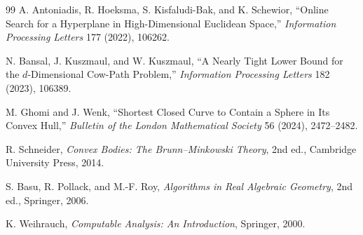 \documentclass[10pt,a4paper]{article}
\theoremstyle{definition}
\theoremstyle{remark}
\begin{document}
\begin{thebibliography}{99}
A. Antoniadis, R. Hoeksma, S. Kisfaludi-Bak, and K. Schewior,
``Online Search for a Hyperplane in High-Dimensional Euclidean Space,''
\emph{Information Processing Letters} 177 (2022), 106262.

N. Bansal, J. Kuszmaul, and W. Kuszmaul,
``A Nearly Tight Lower Bound for the $d$-Dimensional Cow-Path Problem,''
\emph{Information Processing Letters} 182 (2023), 106389.

M. Ghomi and J. Wenk,
``Shortest Closed Curve to Contain a Sphere in Its Convex Hull,''
\emph{Bulletin of the London Mathematical Society} 56 (2024), 2472--2482.

R. Schneider,
\emph{Convex Bodies: The Brunn--Minkowski Theory}, 2nd ed., Cambridge University Press, 2014.

S. Basu, R. Pollack, and M.-F. Roy,
\emph{Algorithms in Real Algebraic Geometry}, 2nd ed., Springer, 2006.

K. Weihrauch,
\emph{Computable Analysis: An Introduction}, Springer, 2000.
\end{thebibliography}
\end{document}
